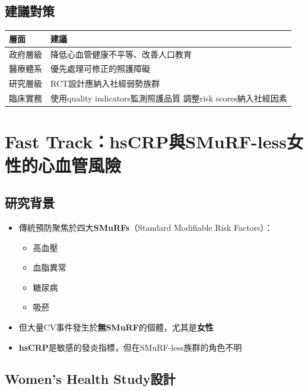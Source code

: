 \documentclass[12pt,a4paper]{article}
\begin{document}
\subsection{建議對策}

\begin{longtable}{p{4cm}p{10cm}}
\toprule
\textbf{層面} & \textbf{建議} \\
\midrule
\endfirsthead
\bottomrule
\endfoot

政府層級 & 降低心血管健康不平等、改善人口教育 \\
\midrule
醫療體系 & 優先處理可修正的照護障礙 \\
\midrule
研究層級 & RCT設計應納入社經弱勢族群 \\
\midrule
臨床實務 & 使用quality indicators監測照護品質\newline
調整risk scores納入社經因素 \\
\bottomrule
\end{longtable}

\section{Fast Track：hsCRP與SMuRF-less女性的心血管風險}

\subsection{研究背景}

\begin{itemize}
    \item 傳統預防聚焦於四大\textbf{SMuRFs}（Standard Modifiable Risk Factors）：
    \begin{itemize}
        \item 高血壓
        \item 血脂異常
        \item 糖尿病
        \item 吸菸
    \end{itemize}
    \item 但大量CV事件發生於\textbf{無SMuRF}的個體，尤其是\textbf{女性}
    \item \textbf{hsCRP}是敏感的發炎指標，但在SMuRF-less族群的角色不明
\end{itemize}

\subsection{Women's Health Study設計}
\end{document}
